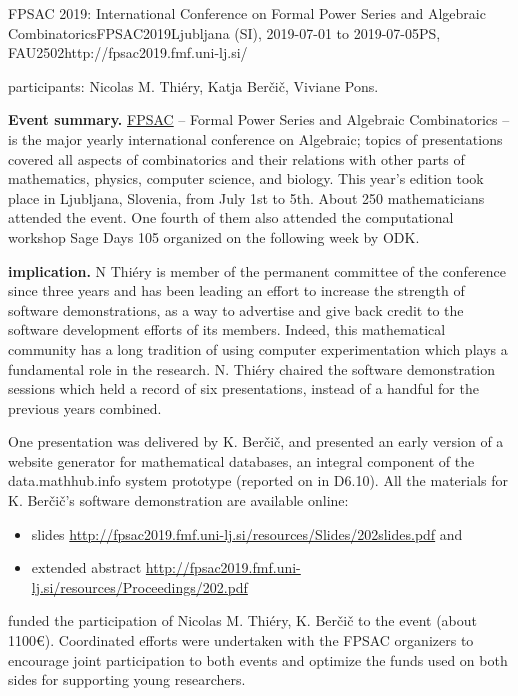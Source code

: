 \begin{event}{FPSAC 2019: International Conference on Formal Power Series and Algebraic Combinatorics}{FPSAC2019}{Ljubljana (SI),
  2019-07-01 to
  2019-07-05}{PS, FAU}{250}{2}{http://fpsac2019.fmf.uni-lj.si/}

\ODK participants: Nicolas M. Thi\'ery, Katja Ber\v{c}i\v{c}, Viviane
Pons.

\textbf{Event summary.} \href{http://fpsac.org}{FPSAC} -- Formal Power
Series and Algebraic Combinatorics -- is the major yearly
international conference on Algebraic; topics of presentations covered
all aspects of combinatorics and their relations with other parts of
mathematics, physics, computer science, and biology. This year's
edition took place in Ljubljana, Slovenia, from July 1st to 5th. About
250 mathematicians attended the event. One fourth of them also
attended the computational workshop Sage Days 105 organized on the
following week by ODK.

\textbf{\ODK implication.} N Thiéry is member of the permanent
committee of the conference since three years and has been leading an
effort to increase the strength of software demonstrations, as a way
to advertise and give back credit to the software development efforts
of its members. Indeed, this mathematical community has a long
tradition of using computer experimentation which plays a fundamental
role in the research. N. Thiéry chaired the software demonstration
sessions which held a record of six presentations, instead of a
handful for the previous years combined.

One presentation was delivered by K. Ber\v{c}i\v{c}, and presented an
early version of a website generator for mathematical databases, an
integral component of the \textsf{data.math\-hub.info} system
prototype (reported on in D6.10). All the materials for K.
Ber\v{c}i\v{c}'s software demonstration are available online:
\begin{itemize}
\item slides \url{http://fpsac2019.fmf.uni-lj.si/resources/Slides/202slides.pdf} and
\item extended abstract \url{http://fpsac2019.fmf.uni-lj.si/resources/Proceedings/202.pdf}
\end{itemize}

\ODK funded the participation of Nicolas M. Thiéry, K. Ber\v{c}i\v{c}
to the event (about 1100\euro). Coordinated efforts were undertaken
with the FPSAC organizers to encourage joint participation to both
events and optimize the funds used on both sides for supporting young
researchers.


\end{event}
